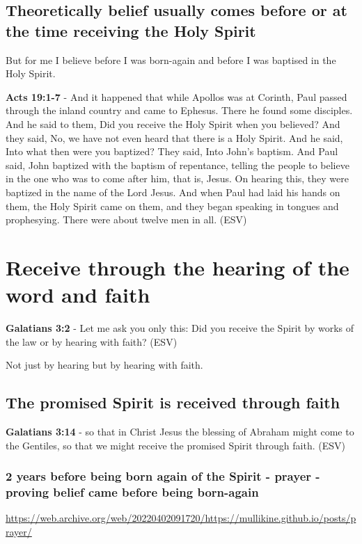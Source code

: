 \documentclass[11pt]{article}
\begin{document}
\subsection{Theoretically belief usually comes before or at the time receiving the Holy Spirit}
\label{sec:orge73ad8a}
But for me I believe before I was born-again and before I was baptised in the Holy Spirit.

\textbf{Acts 19:1-7} - And it happened that while Apollos was at Corinth, Paul passed through the inland country and came to Ephesus.  There he found some disciples.  And he said to them, Did you receive the Holy Spirit when you believed?  And they said, No, we have not even heard that there is a Holy Spirit.  And he said, Into what then were you baptized?  They said, Into John's baptism.  And Paul said, John baptized with the baptism of repentance, telling the people to believe in the one who was to come after him, that is, Jesus. On hearing this, they were baptized in the name of the Lord Jesus. And when Paul had laid his hands on them, the Holy Spirit came on them, and they began speaking in tongues and prophesying. There were about twelve men in all.  (ESV)

\section{Receive through the hearing of the word and faith}
\label{sec:org49c8cfe}
\textbf{Galatians 3:2} - Let me ask you only this: Did you receive the Spirit by works of the law or by hearing with faith? (ESV)

Not just by hearing but by hearing with faith.

\subsection{The promised Spirit is received through faith}
\label{sec:org3aea5ce}
\textbf{Galatians 3:14} - so that in Christ Jesus the blessing of Abraham might come to the Gentiles, so that we might receive the promised Spirit through faith.  (ESV)

\subsubsection{2 years before being born again of the Spirit - prayer - proving belief came before being born-again}
\label{sec:org893631b}
\url{https://web.archive.org/web/20220402091720/https://mullikine.github.io/posts/prayer/}
\end{document}

